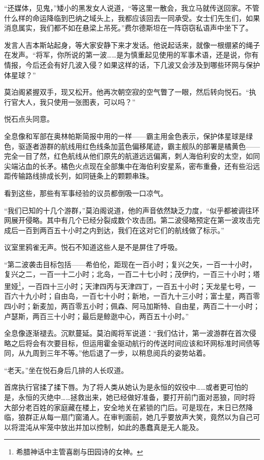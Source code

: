\documentclass[AutoFakeBold=true]{book}
\begin{document}
``还媒体，见鬼，''矮小的黑发女人说道，``等这里一散会，我立马就传送回家。不管什么样的命运降临到巴纳之域头上，我都应该回去一同承受。女士们先生们，如果消息属实，我们都不如在悬梁上吊死。''费尔德斯坦在一阵窃窃私语声中坐下了。

发言人吉本斯站起身，等大家安静下来才发话。他说起话来，就像一根绷紧的绳子在发声。``将军，你所说的{\kaishu 第一波}……是为慎重起见使用的军事术语，还是说，你有情报，今后还会有好几波入侵？如果这样的话，下几波又会涉及到哪些环网与保护体星球？''

莫泊阁紧握双手，现又松开。他再次朝空寂的空气瞥了一眼，然后转向悦石。``执行官大人，我只使用一张图表，可以吗？''

悦石点头同意。

全息像和军部在奥林帕斯简报中用的一样——霸主用金色表示，保护体星球是绿色，驱逐者游群的航线用红色线条加蓝色偏移尾迹，霸主舰队的部署是橘黄色——完全一目了然，红色航线从他们原先的航道远远偏离，刺人海伯利安的太空，如同尖端沾血的长矛。橘色火点现在全部集中在海伯利安星系，密布重叠，还有些沿远距传输路线排成长列，如同链条上的颗颗串珠。

看到这些，那些有军事经验的议员都倒吸一口凉气。

``我们已知的十几个游群，''莫泊阁说道，他的声音依然缺乏力度，``似乎都被调往环网展开侵略。其中有几个已经分裂成数个攻击团。第二波侵略预定在第一波攻击完成后一百到两百五十小时之内到达，我们在这对它们的航线做了标示。''

议室里鸦雀无声。悦石不知道这些人是不是屏住了呼吸。

``第二波袭击目标包括——希伯伦，距现在一百小时；复兴之矢，一百一十小时，复兴之二，一百一十二小时；北岛，一百二十七小时；茂伊约，一百三十小时；塔里娅\footnote{希腊神话中主管喜剧与田园诗的女神。}，一百四十三小时；天津四丙与天津四丁，一百五十小时；天龙星七号，一百六十九小时；自由岛，一百七十小时；新地，一百九十三小时；富士星，两百零四小时；新麦加，两百零五小时；佩森、阿马加斯特、自由星，两百二十一小时；卢瑟斯，两百三十小时；最后是鲸逖中心，两百五十小时。''

全息像逐渐褪去。沉默蔓延。莫泊阁将军说道：``我们估计，第一波游群在首次侵略之后将会有次要目标，但运用霍金驱动航行的传送时间应该和环网标准时间债等同，从九周到三年不等。''他后退了一步，以稍息阅兵的姿势站着。

``老天。''坐在悦石身后几排的人长叹道。

首席执行官揉了揉下唇。为了将人类从她认为是永恒的奴役中……或者更可怕的是，永恒的灭绝中……拯救出来，她已经做好准备，要打开前门面对恶狼，同时将大部分老百姓的家庭藏在楼上，安全地关在紧锁的门后。可是现在，末日已然降临，狼群正从每一扇门窗涌人。在审判面前，她几乎要放声大笑，竟然以为自己可以将混沌从牢笼中放出并加以控制，如此的愚蠢真是无人能及。
\end{document}

